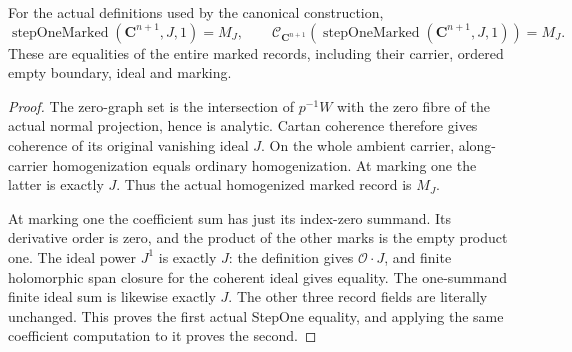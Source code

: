 \begin{lemma}
\label{hir:actual-zero-coordinate-stepone-object}
\leanok
For the actual definitions used by the canonical construction,
\[
 \operatorname{stepOneMarked}(\mathbf C^{n+1},J,1)=M_J,
 \qquad \mathcal C_{\mathbf C^{n+1}}
     (\operatorname{stepOneMarked}(\mathbf C^{n+1},J,1))=M_J.
\]
These are equalities of the entire marked records, including their
carrier, ordered empty boundary, ideal and marking.
\end{lemma}
\begin{proof}
The zero-graph set is the intersection of $p^{-1}W$ with the zero
fibre of the actual normal projection, hence is analytic. Cartan
coherence therefore gives coherence of its original vanishing ideal
$J$. On the whole ambient carrier, along-carrier homogenization
equals ordinary homogenization. At marking one the latter is exactly
$J$. Thus the actual homogenized marked record is $M_J$.

At marking one the coefficient sum has just its index-zero summand.
Its derivative order is zero, and the product of the other marks is
the empty product one. The ideal power $J^1$ is exactly $J$: the
definition gives $\mathcal O\cdot J$, and finite holomorphic span
closure for the coherent ideal gives equality. The one-summand
finite ideal sum is likewise exactly $J$. The other three record
fields are literally unchanged. This proves the first actual
StepOne equality, and applying the same coefficient computation to
it proves the second.
\end{proof}

